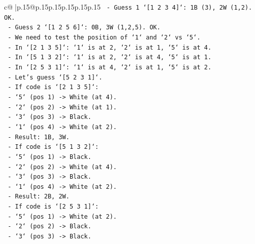 \documentclass{article}
\begin{document}
{\begin{supertabular}{c@{$\;$}|p{.15\linewidth}@{}p{.15\linewidth}p{.15\linewidth}p{.15\linewidth}p{.15\linewidth}p{.15\linewidth}}
{{{\texttt{                        {-} Guess 1 `{[}1 2 3 4{]}`: 1B (3), 2W (1,2). OK.} \\
\texttt{                        {-} Guess 2 `{[}1 2 5 6{]}`: 0B, 3W (1,2,5). OK.} \\
\texttt{                    {-} We need to test the position of `1` and `2` vs `5`.} \\
\texttt{                    {-} In `{[}2 1 3 5{]}`: `1` is at 2, `2` is at 1, `5` is at 4.} \\
\texttt{                    {-} In `{[}5 1 3 2{]}`: `1` is at 2, `2` is at 4, `5` is at 1.} \\
\texttt{                    {-} In `{[}2 5 3 1{]}`: `1` is at 4, `2` is at 1, `5` is at 2.} \\
\texttt{                    {-} Let's guess `{[}5 2 3 1{]}`.} \\
\texttt{                        {-} If code is `{[}2 1 3 5{]}`:} \\
\texttt{                            {-} `5` (pos 1) {-}> White (at 4).} \\
\texttt{                            {-} `2` (pos 2) {-}> White (at 1).} \\
\texttt{                            {-} `3` (pos 3) {-}> Black.} \\
\texttt{                            {-} `1` (pos 4) {-}> White (at 2).} \\
\texttt{                            {-} Result: 1B, 3W.} \\
\texttt{                        {-} If code is `{[}5 1 3 2{]}`:} \\
\texttt{                            {-} `5` (pos 1) {-}> Black.} \\
\texttt{                            {-} `2` (pos 2) {-}> White (at 4).} \\
\texttt{                            {-} `3` (pos 3) {-}> Black.} \\
\texttt{                            {-} `1` (pos 4) {-}> White (at 2).} \\
\texttt{                            {-} Result: 2B, 2W.} \\
\texttt{                        {-} If code is `{[}2 5 3 1{]}`:} \\
\texttt{                            {-} `5` (pos 1) {-}> White (at 2).} \\
\texttt{                            {-} `2` (pos 2) {-}> Black.} \\
\texttt{                            {-} `3` (pos 3) {-}> Black.} \\
}}}
\end{supertabular}}
\end{document}
